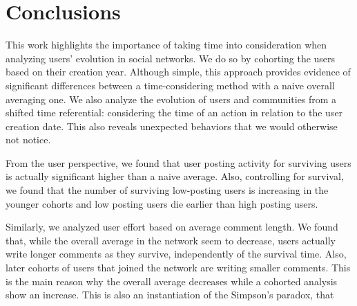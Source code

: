 %

\section{Conclusions}

This work highlights the importance of taking time into consideration when analyzing users' evolution in social networks. We do so by cohorting the users based on their creation year. Although simple, this approach provides evidence of significant differences between a time-considering method with a naive overall averaging one. We also analyze the evolution of users and communities from a shifted time referential: considering the time of an action in relation to the user creation date. This also reveals unexpected behaviors that we would otherwise not notice.

From the user perspective, we found that user posting activity for surviving users is actually significant higher than a naive average. Also, controlling for survival, we found that the number of surviving low-posting users is increasing in the younger cohorts and low posting users die earlier than high posting users. 

Similarly, we analyzed user effort based on average comment length. We found that, while the overall average in the network seem to decrease, users actually write longer comments as they survive, independently of the survival time. Also, later cohorts of users that joined the network are writing smaller comments. This is the main reason why the overall average decreases while a cohorted analysis show an increase. This is also an instantiation of the Simpson's paradox, that%

